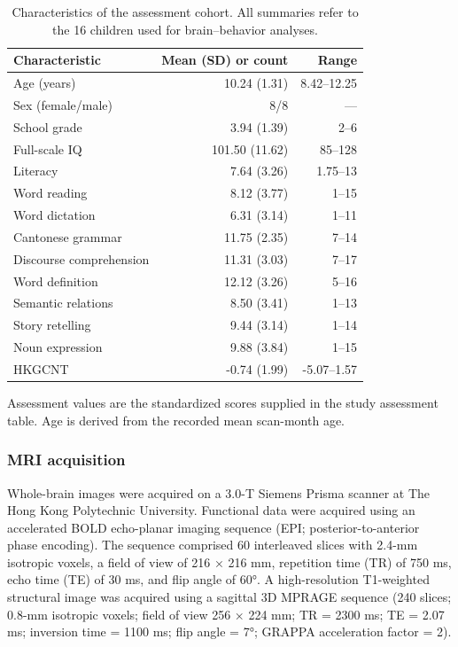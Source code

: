 \begin{table}[htbp]\centering\small
\caption{Characteristics of the assessment cohort. All summaries refer to the 16 children used for brain--behavior analyses.}\label{tab:sample}
\begin{tabular}{lrr}\toprule Characteristic & Mean (SD) or count & Range \\\midrule
Age (years) & 10.24 (1.31) & 8.42--12.25 \\
Sex (female/male) & 8/8 & --- \\
School grade & 3.94 (1.39) & 2--6 \\\midrule
Full-scale IQ & 101.50 (11.62) & 85--128 \\
Literacy & 7.64 (3.26) & 1.75--13 \\
Word reading & 8.12 (3.77) & 1--15 \\
Word dictation & 6.31 (3.14) & 1--11 \\
Cantonese grammar & 11.75 (2.35) & 7--14 \\
Discourse comprehension & 11.31 (3.03) & 7--17 \\
Word definition & 12.12 (3.26) & 5--16 \\
Semantic relations & 8.50 (3.41) & 1--13 \\
Story retelling & 9.44 (3.14) & 1--14 \\
Noun expression & 9.88 (3.84) & 1--15 \\
HKGCNT & -0.74 (1.99) & -5.07--1.57 \\
\bottomrule\end{tabular}
\par\smallskip\begin{minipage}{.94\linewidth}\footnotesize Assessment values are the standardized scores supplied in the study assessment table. Age is derived from the recorded mean scan-month age.\end{minipage}
\end{table}

\subsubsection{MRI acquisition}
Whole-brain images were acquired on a 3.0-T Siemens Prisma scanner at The Hong Kong Polytechnic University. Functional data were acquired using an accelerated BOLD echo-planar imaging sequence (EPI; posterior-to-anterior phase encoding). The sequence comprised 60 interleaved slices with 2.4-mm isotropic voxels, a field of view of 216 × 216 mm, repetition time (TR) of 750 ms, echo time (TE) of 30 ms, and flip angle of 60°. A high-resolution T1-weighted structural image was acquired using a sagittal 3D MPRAGE sequence (240 slices; 0.8-mm isotropic voxels; field of view 256 × 224 mm; TR = 2300 ms; TE = 2.07 ms; inversion time = 1100 ms; flip angle = 7°; GRAPPA acceleration factor = 2).

